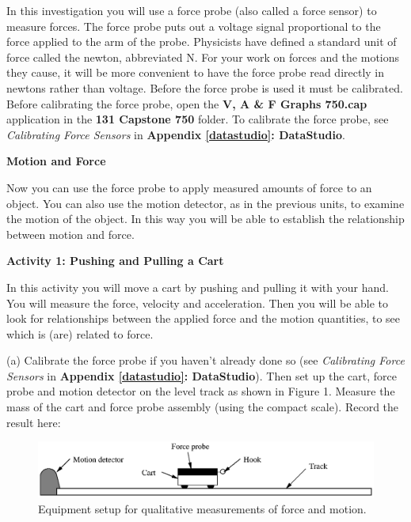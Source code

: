 In this investigation you will use a force probe (also called a force sensor) to measure forces. The force probe puts out a voltage signal proportional to the force applied to the arm of the probe. Physicists have defined a standard unit of force called the newton, abbreviated N. For your work on forces and the motions they cause, it will be more convenient to have the force probe read directly in newtons rather than voltage. Before the force probe is used it must be calibrated. Before calibrating the force probe, open the \textbf{V, A \& F Graphs 750.cap} application in the \textbf{131 Capstone 750} folder. To calibrate the force probe, see \textit{Calibrating Force Sensors} in \textbf{Appendix \ref{datastudio}: DataStudio}.

\pagebreak[2]
\textbf{Motion and Force} 

Now you can use the force probe to apply measured amounts of force to an object.
You can also use the motion detector, as in the previous units, to examine the
motion of the object. In this way you will be able to establish the relationship
between motion and force.
\vspace{10mm}

\textbf{Activity 1: Pushing and Pulling a Cart} 

In this activity you will move a cart by pushing and pulling it with your hand.
You will measure the force, velocity and acceleration. Then you will be able
to look for relationships between the applied force and the motion quantities,
to see which is (are) related to force.

(a) Calibrate the force probe if you haven't already done so (see \textit{Calibrating Force Sensors} in \textbf{Appendix \ref{datastudio}: DataStudio}). Then set up the cart, force probe and motion detector on the level track as shown in Figure 1. Measure the mass of the cart and force probe assembly (using the compact scale). Record the result here:

\answerspace{15mm}

\begin{figure}[t]
{\par\centering \includegraphics{force1/force1_fig1.eps} \par}


\caption{Equipment setup for qualitative measurements of force and motion.}
\end{figure}


